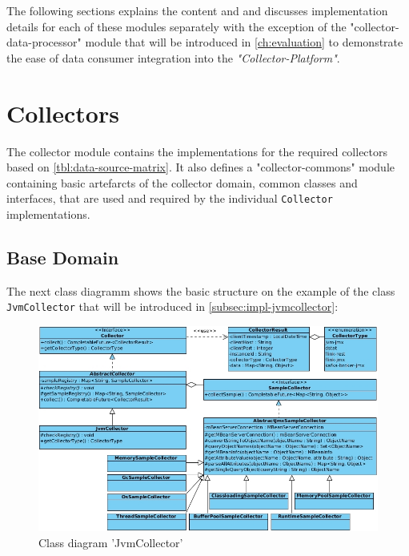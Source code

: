The following sections explains the content and and discusses implementation details for each of these modules separately with the
exception of the "collector-data-processor" module that will be introduced in \autoref{ch:evaluation} to demonstrate the ease of data
consumer integration into the \textit{"Collector-Platform"}.

\section{Collectors}
\label{sec:impl-collectors}

The collector module contains the implementations for the required collectors based on \autoref{tbl:data-source-matrix}.
It also defines a "collector-commons" module containing basic artefarcts
of the collector domain, common classes and interfaces, that are used and required by the individual
\verb|Collector| implementations.

\subsection{Base Domain}

The next class diagramm shows the basic structure on the example of the class \verb|JvmCollector| that will be introduced in
\autoref{subsec:impl-jvmcollector}:
\begin{figure}[H]
	\centering
	\includegraphics[width=1.0\textwidth]{../uml/class-jvm-collector.jpg}
	\caption{Class diagram 'JvmCollector'}
	\label{class-diagram-jvm-collector}
\end{figure}

